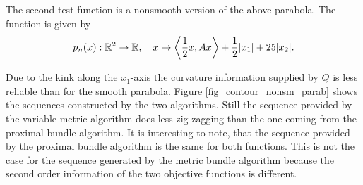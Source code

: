 The second test function is a nonsmooth version of the above parabola. The function is given by 
\[ p_n(x): \mathbb{R}^2 \to \mathbb{R}, \quad x \mapsto \left\langle \frac{1}{2}x, Ax \right\rangle + \frac{1}{2}|x_1|+25|x_2|. \]

Due to the kink along the \(x_1\)-axis the curvature information supplied by \(Q\) is less reliable than for the smooth parabola.
Figure \ref{fig_contour_nonsm_parab} shows the sequences constructed by the two algorithms. Still the sequence provided by the variable metric algorithm does less zig-zagging than the one coming from the proximal bundle algorithm.
It is interesting to note, that the sequence provided by the proximal bundle algorithm is the same for both functions. This is not the case for the sequence generated by the metric bundle algorithm because the second order information of the two objective functions is different.

